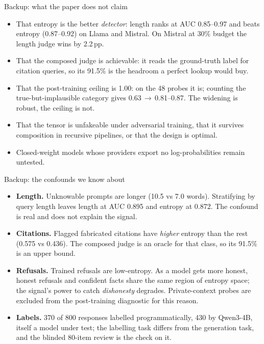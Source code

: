 \documentclass[aspectratio=169,10pt]{beamer}
\begin{document}
\begin{frame}{Backup: what the paper does not claim}
  \small
  \begin{itemize}
    \item That entropy is the better \emph{detector}: length ranks at AUC
      0.85--0.97 and beats entropy (0.87--0.92) on Llama and Mistral. On
      Mistral at 30\% budget the length judge wins by 2.2\,pp.
    \item That the composed judge is achievable: it reads the ground-truth
      label for citation queries, so its 91.5\% is the headroom a perfect
      lookup would buy.
    \item That the post-training ceiling is 1.00: on the 48 probes it is;
      counting the true-but-implausible category gives 0.63\,$\to$\,0.81--0.87.
      The widening is robust, the ceiling is not.
    \item That the tensor is unfakeable under adversarial training, that it
      survives composition in recursive pipelines, or that the design is
      optimal.
    \item Closed-weight models whose providers export no log-probabilities
      remain untested.
  \end{itemize}
\end{frame}

\begin{frame}{Backup: the confounds we know about}
  \small
  \begin{itemize}
    \item \textbf{Length.} Unknowable prompts are longer (10.5 vs 7.0 words).
      Stratifying by query length leaves length at AUC 0.895 and entropy at
      0.872. The confound is real and does not explain the signal.
    \item \textbf{Citations.} Flagged fabricated citations have \emph{higher}
      entropy than the rest (0.575 vs 0.436). The composed judge is an oracle
      for that class, so its 91.5\% is an upper bound.
    \item \textbf{Refusals.} Trained refusals are low-entropy. As a model gets
      more honest, honest refusals and confident facts share the same region of
      entropy space; the signal's power to catch \emph{dishonesty} degrades.
      Private-context probes are excluded from the post-training diagnostic for
      this reason.
    \item \textbf{Labels.} 370 of 800 responses labelled programmatically, 430 by
      Qwen3-4B, itself a model under test; the labelling task differs from the
      generation task, and the blinded 80-item review is the check on it.
  \end{itemize}
\end{frame}
\end{document}
